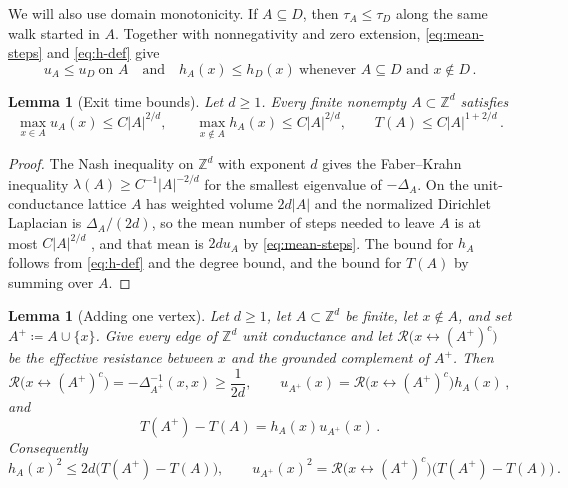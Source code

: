 \documentclass[11pt]{amsart}
\theoremstyle{plain}
\newtheorem{lemma}[theorem]{Lemma}
\theoremstyle{definition}
\newcommand{\Z}{\mathbb Z}
\newcommand{\Reff}{\mathcal R}
\begin{document}
	We will also use domain monotonicity. If $A\subseteq D$, then
	$\tau_A\leq\tau_D$ along the same walk started in $A$. Together with
	nonnegativity and zero extension, \eqref{eq:mean-steps} and \eqref{eq:h-def}
	give
	\[
	u_A\leq u_D\ \text{on }A
	\quad\text{and}\quad
	h_A(x)\leq h_D(x)\ \text{whenever }A\subseteq D\text{ and }x\notin D\, .
	\]

	\begin{lemma}[Exit time bounds]\label{lem:max-exit}
		Let $d\geq1$. Every finite nonempty $A\subset\Z^d$ satisfies
		\[
		\max_{x\in A}u_A(x)\leq C|A|^{2/d},
		\qquad
		\max_{x\notin A}h_A(x)\leq C|A|^{2/d},
		\qquad
		T(A)\leq C|A|^{1+2/d}\, .
		\]
	\end{lemma}

	\begin{proof}
		The Nash inequality on $\Z^d$ with exponent $d$
		\citep[Lemma~3.13]{Barlow2017} gives the Faber--Krahn inequality
		$\lambda(A)\geq C^{-1}|A|^{-2/d}$ for the smallest eigenvalue of $-\Delta_A$.
		On the unit-conductance lattice $A$ has weighted volume $2d|A|$ and the
		normalized Dirichlet Laplacian is $\Delta_A/(2d)$, so the mean number of steps needed
		to leave $A$ is at most $C|A|^{2/d}$
		\citep[Proposition~3.5]{Telcs2006}, and that mean
		is $2du_A$ by \eqref{eq:mean-steps}.  The bound for $h_A$ follows from
		\eqref{eq:h-def} and the degree bound, and the bound for $T(A)$ by summing
		over $A$.
	\end{proof}

	\begin{lemma}[Adding one vertex]\label{lem:schur}
		Let $d\geq1$, let $A\subset\Z^d$ be finite, let $x\notin A$, and set
		$A^+\coloneqq A\cup\{x\}$.  Give every edge of $\Z^d$ unit conductance and
		let $\Reff\bigl(x\leftrightarrow(A^+)^c\bigr)$ be the effective resistance
		between $x$ and the grounded complement of $A^+$.  Then
		\begin{equation}\label{eq:schur}
			\Reff\bigl(x\leftrightarrow(A^+)^c\bigr)=-\Delta_{A^+}^{-1}(x,x)\geq\frac1{2d},
			\qquad
			u_{A^+}(x)=\Reff\bigl(x\leftrightarrow(A^+)^c\bigr)h_A(x)\, ,
		\end{equation}
		and
		\begin{equation}\label{eq:deltaT}
			T(A^+)-T(A)=h_A(x)u_{A^+}(x)\, .
		\end{equation}
		Consequently
		\begin{equation}\label{eq:hbound}
			h_A(x)^2\leq2d\bigl(T(A^+)-T(A)\bigr),
			\qquad
			u_{A^+}(x)^2
			=\Reff\bigl(x\leftrightarrow(A^+)^c\bigr)\bigl(T(A^+)-T(A)\bigr)\, .
		\end{equation}
	\end{lemma}
\end{document}
